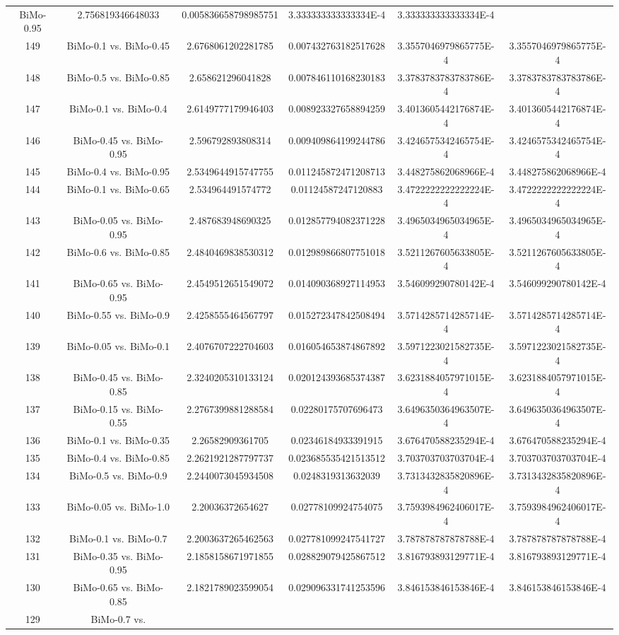 \documentclass[a4paper,10pt]{article}
\begin{document}
\begin{landscape}
\begin{table}[!htp]
\begin{tabular}{cccccc}
BiMo-0.95&2.756819346648033&0.005836658798985751&3.333333333333334E-4&3.333333333333334E-4\\149&BiMo-0.1 vs. BiMo-0.45&2.6768061202281785&0.007432763182517628&3.3557046979865775E-4&3.3557046979865775E-4\\148&BiMo-0.5 vs. BiMo-0.85&2.658621296041828&0.007846110168230183&3.3783783783783786E-4&3.3783783783783786E-4\\147&BiMo-0.1 vs. BiMo-0.4&2.6149777179946403&0.008923327658894259&3.4013605442176874E-4&3.4013605442176874E-4\\146&BiMo-0.45 vs. BiMo-0.95&2.596792893808314&0.009409864199244786&3.4246575342465754E-4&3.4246575342465754E-4\\145&BiMo-0.4 vs. BiMo-0.95&2.5349644915747755&0.011245872471208713&3.448275862068966E-4&3.448275862068966E-4\\144&BiMo-0.1 vs. BiMo-0.65&2.534964491574772&0.01124587247120883&3.4722222222222224E-4&3.4722222222222224E-4\\143&BiMo-0.05 vs. BiMo-0.95&2.487683948690325&0.012857794082371228&3.4965034965034965E-4&3.4965034965034965E-4\\142&BiMo-0.6 vs. BiMo-0.85&2.4840469838530312&0.012989866807751018&3.5211267605633805E-4&3.5211267605633805E-4\\141&BiMo-0.65 vs. BiMo-0.95&2.4549512651549072&0.014090368927114953&3.546099290780142E-4&3.546099290780142E-4\\140&BiMo-0.55 vs. BiMo-0.9&2.4258555464567797&0.015272347842508494&3.5714285714285714E-4&3.5714285714285714E-4\\139&BiMo-0.05 vs. BiMo-0.1&2.4076707222704603&0.016054653874867892&3.5971223021582735E-4&3.5971223021582735E-4\\138&BiMo-0.45 vs. BiMo-0.85&2.3240205310133124&0.020124393685374387&3.6231884057971015E-4&3.6231884057971015E-4\\137&BiMo-0.15 vs. BiMo-0.55&2.2767399881288584&0.02280175707696473&3.6496350364963507E-4&3.6496350364963507E-4\\136&BiMo-0.1 vs. BiMo-0.35&2.26582909361705&0.02346184933391915&3.676470588235294E-4&3.676470588235294E-4\\135&BiMo-0.4 vs. BiMo-0.85&2.2621921287797737&0.023685535421513512&3.703703703703704E-4&3.703703703703704E-4\\134&BiMo-0.5 vs. BiMo-0.9&2.2440073045934508&0.0248319313632039&3.7313432835820896E-4&3.7313432835820896E-4\\133&BiMo-0.05 vs. BiMo-1.0&2.20036372654627&0.02778109924754075&3.7593984962406017E-4&3.7593984962406017E-4\\132&BiMo-0.1 vs. BiMo-0.7&2.2003637265462563&0.027781099247541727&3.787878787878788E-4&3.787878787878788E-4\\131&BiMo-0.35 vs. BiMo-0.95&2.1858158671971855&0.028829079425867512&3.816793893129771E-4&3.816793893129771E-4\\130&BiMo-0.65 vs. BiMo-0.85&2.1821789023599054&0.029096331741253596&3.846153846153846E-4&3.846153846153846E-4\\129&BiMo-0.7 vs. 
\end{tabular}
\end{table}
\end{landscape}
\end{document}
